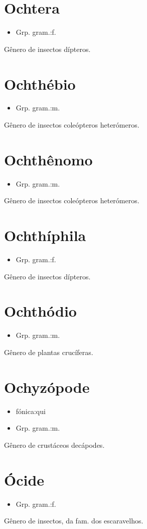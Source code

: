 \section{Ochtera}
\begin{itemize}
\item {Grp. gram.:f.}
\end{itemize}
Gênero de insectos dípteros.
\section{Ochthébio}
\begin{itemize}
\item {Grp. gram.:m.}
\end{itemize}
Gênero de insectos coleópteros heterómeros.
\section{Ochthênomo}
\begin{itemize}
\item {Grp. gram.:m.}
\end{itemize}
Gênero de insectos coleópteros heterómeros.
\section{Ochthíphila}
\begin{itemize}
\item {Grp. gram.:f.}
\end{itemize}
Gênero de insectos dípteros.
\section{Ochthódio}
\begin{itemize}
\item {Grp. gram.:m.}
\end{itemize}
Gênero de plantas crucíferas.
\section{Ochyzópode}
\begin{itemize}
\item {fónica:qui}
\end{itemize}
\begin{itemize}
\item {Grp. gram.:m.}
\end{itemize}
Gênero de crustáceos decápodes.
\section{Ócide}
\begin{itemize}
\item {Grp. gram.:f.}
\end{itemize}
Gênero de insectos, da fam. dos escaravelhos.

